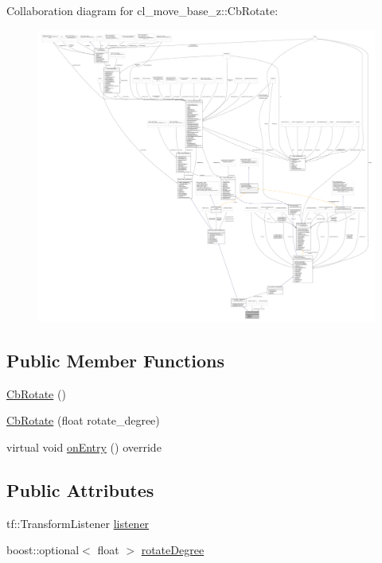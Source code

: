Collaboration diagram for cl\+\_\+move\+\_\+base\+\_\+z\+:\+:Cb\+Rotate\+:
\nopagebreak
\begin{figure}[H]
\begin{center}
\leavevmode
\includegraphics[width=350pt]{classcl__move__base__z_1_1CbRotate__coll__graph}
\end{center}
\end{figure}
\subsection*{Public Member Functions}
\begin{DoxyCompactItemize}
\item 
\hyperlink{classcl__move__base__z_1_1CbRotate_a00dc68fbc8e72461f338de1cbdfceffd}{Cb\+Rotate} ()
\item 
\hyperlink{classcl__move__base__z_1_1CbRotate_ac5b1f8c358d719d2cdc8417f65143ad8}{Cb\+Rotate} (float rotate\+\_\+degree)
\item 
virtual void \hyperlink{classcl__move__base__z_1_1CbRotate_a316ee51ecfd3f10fd1edae0d7d3b26c0}{on\+Entry} () override
\end{DoxyCompactItemize}
\subsection*{Public Attributes}
\begin{DoxyCompactItemize}
\item 
tf\+::\+Transform\+Listener \hyperlink{classcl__move__base__z_1_1CbRotate_a2b57c5f392fde0a3bf38f5fd6e1bde11}{listener}
\item 
boost\+::optional$<$ float $>$ \hyperlink{classcl__move__base__z_1_1CbRotate_a83e9f97e917044f919c98a55d8e00db6}{rotate\+Degree}
\end{DoxyCompactItemize}
